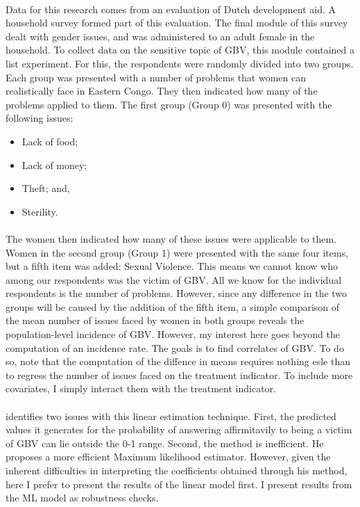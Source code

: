 \documentclass[11pt,a4paper]{scrartcl} %
\begin{document}
\paragraph{}
Data for this research comes from an evaluation of Dutch development aid. A household survey formed part of this evaluation. The final module of this survey dealt with gender issues, and was administered to an adult female in the household.  To collect data on the sensitive topic of GBV, this module contained a list experiment. For this, the respondents were randomly divided into two groups. Each group was presented with a number of problems that women can realistically face in Eastern Congo. They then indicated how many of the problems applied to them. The first group (Group 0) was presented with the following issues:
\begin{itemize}
	\item Lack of food;
	\item Lack of money;
	\item Theft; and,
	\item Sterility.
\end{itemize}

\paragraph{}
The women then indicated how many of these issues were applicable to them. Women in the second group (Group 1) were presented with the same four items, but a fifth item was added: Sexual Violence. This means we cannot know who among our respondents was the victim of GBV. All we know for the individual respondents is the number of problems. However, since any difference in the two groups will be caused by the addition of the fifth item, a simple comparison of the mean number of issues faced by women in both groups reveals the population-level incidence of GBV. However, my interest here goes beyond the computation of an incidence rate. The goals is to find correlates of GBV. To do so, note that the computation of the diffence in means requires nothing esle than to regress the number of issues faced on the treatment indicator. To include more covariates, I simply interact them with the treatment indicator.

\paragraph{}
\cite{Imai2011} identifies two issues with this linear estimation technique. First, the predicted values it generates for the probability of answering affirmitavily to being a victim of GBV can lie outside the 0-1 range. Second, the method is inefficient. He proposes a more efficient Maximum likelihood estimator. However, given the inherent difficulties in interpreting the coefficients obtained through his method, here I prefer to present the results of the linear model first. I present results from the ML model as robustness checks. 
\end{document}
